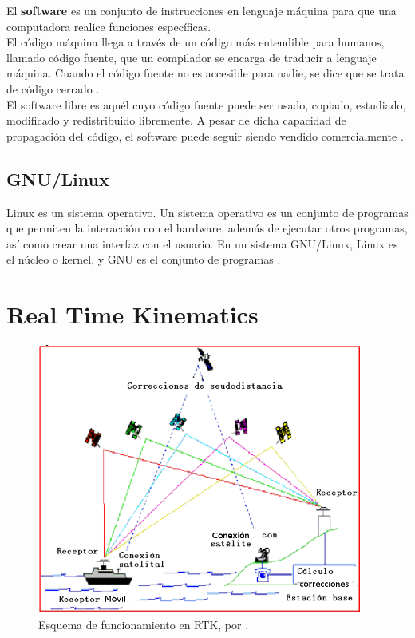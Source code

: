 El \textbf{software} es un conjunto de instrucciones en lenguaje máquina para que una computadora realice funciones específicas.\\

El código máquina llega a través de un código más entendible para humanos, llamado código fuente, que un compilador se encarga de traducir a lenguaje máquina. Cuando el código fuente no es accesible para nadie, se dice que se trata de código cerrado \citep{i2005software}.\\

El software libre es aquél cuyo código fuente puede ser usado, copiado, estudiado, modificado y redistribuido libremente. A pesar de dicha capacidad de propagación del código, el software puede seguir siendo vendido comercialmente \citep{garcia2007promocion}. 

\subsection{GNU/Linux}
Linux es un sistema operativo. Un sistema operativo es un conjunto de programas que permiten la interacción con el hardware, además de ejecutar otros programas, así como crear una interfaz con el usuario. En un sistema GNU/Linux, Linux es el núcleo o kernel, y GNU es el conjunto de programas \citep{debian}. 


\section{Real Time Kinematics}

\begin{figure}[H]
\centering
\includegraphics[width=0.95\textwidth]{Figures/DGPS1}
\caption[Esquema de funcionamiento en RTK.]{Esquema de funcionamiento en RTK, por \cite{fallas2002sistema}.}
\label{fig:RTK}
\end{figure}

